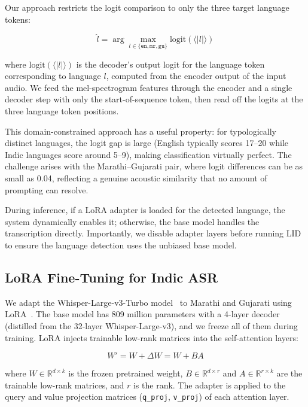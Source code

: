 Our approach restricts the logit comparison to only the three target language tokens:

\begin{equation}
\hat{l} = \arg\max_{l \in \{\texttt{en}, \texttt{mr}, \texttt{gu}\}} \text{logit}(\langle|l|\rangle)
\label{eq:lid}
\end{equation}

where $\text{logit}(\langle|l|\rangle)$ is the decoder's output logit for the language token corresponding to language $l$, computed from the encoder output of the input audio. We feed the mel-spectrogram features through the encoder and a single decoder step with only the start-of-sequence token, then read off the logits at the three language token positions.

This domain-constrained approach has a useful property: for typologically distinct languages, the logit gap is large (English typically scores 17--20 while Indic languages score around 5--9), making classification virtually perfect. The challenge arises with the Marathi--Gujarati pair, where logit differences can be as small as 0.04, reflecting a genuine acoustic similarity that no amount of prompting can resolve.

During inference, if a LoRA adapter is loaded for the detected language, the system dynamically enables it; otherwise, the base model handles the transcription directly. Importantly, we disable adapter layers before running LID to ensure the language detection uses the unbiased base model.

\subsection{LoRA Fine-Tuning for Indic ASR}
\label{sec:lora}

We adapt the Whisper-Large-v3-Turbo model~\cite{openai_whisper_turbo} to Marathi and Gujarati using LoRA~\cite{hu2022lora}. The base model has 809 million parameters with a 4-layer decoder (distilled from the 32-layer Whisper-Large-v3), and we freeze all of them during training. LoRA injects trainable low-rank matrices into the self-attention layers:

\begin{equation}
W' = W + \Delta W = W + BA
\label{eq:lora}
\end{equation}

where $W \in \mathbb{R}^{d \times k}$ is the frozen pretrained weight, $B \in \mathbb{R}^{d \times r}$ and $A \in \mathbb{R}^{r \times k}$ are the trainable low-rank matrices, and $r$ is the rank. The adapter is applied to the query and value projection matrices (\texttt{q\_proj}, \texttt{v\_proj}) of each attention layer.

